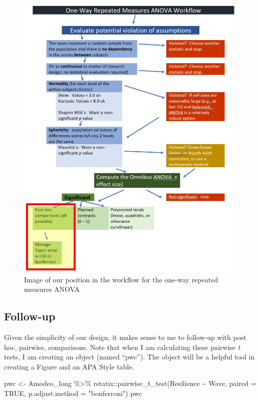 \documentclass[
  11pt,
]{book}
\newenvironment{Shaded}{\begin{snugshade}}{\end{snugshade}}
\newcommand{\AttributeTok}[1]{\textcolor[rgb]{0.77,0.63,0.00}{#1}}
\newcommand{\ConstantTok}[1]{\textcolor[rgb]{0.00,0.00,0.00}{#1}}
\newcommand{\FunctionTok}[1]{\textcolor[rgb]{0.00,0.00,0.00}{#1}}
\newcommand{\NormalTok}[1]{#1}
\newcommand{\OtherTok}[1]{\textcolor[rgb]{0.56,0.35,0.01}{#1}}
\newcommand{\SpecialCharTok}[1]{\textcolor[rgb]{0.00,0.00,0.00}{#1}}
\newcommand{\StringTok}[1]{\textcolor[rgb]{0.31,0.60,0.02}{#1}}
\begin{document}
\begin{figure}
\centering
\includegraphics{images/oneway_repeated/wf_rptd_pairwise.jpg}
\caption{Image of our position in the workflow for the one-way repeated measures ANOVA}
\end{figure}

\hypertarget{follow-up}{%
\subsection{Follow-up}\label{follow-up}}

Given the simplicity of our design, it makes sense to me to follow-up with post hoc, pairwise, comparisons. Note that when I am calculating these pairwise \emph{t} tests, I am creating an object (named ``pwc''). The object will be a helpful tool in creating a Figure and an APA Style table.

\begin{Shaded}
\begin{Highlighting}[]
\NormalTok{pwc }\OtherTok{\textless{}{-}}\NormalTok{ Amodeo\_long }\SpecialCharTok{\%\textgreater{}\%}
\NormalTok{    rstatix}\SpecialCharTok{::}\FunctionTok{pairwise\_t\_test}\NormalTok{(Resilience }\SpecialCharTok{\textasciitilde{}}\NormalTok{ Wave, }\AttributeTok{paired =} \ConstantTok{TRUE}\NormalTok{, }\AttributeTok{p.adjust.method =} \StringTok{"bonferroni"}\NormalTok{)}
\NormalTok{pwc}
\end{Highlighting}
\end{Shaded}
\end{document}
